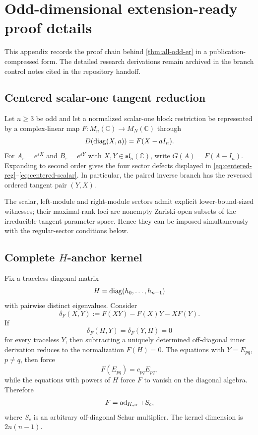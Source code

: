 \section{Odd-dimensional extension-ready proof details}\label{app:odd-proof}

This appendix records the proof chain behind \cref{thm:all-odd-er} in a publication-compressed form. The detailed research derivations remain archived in the branch control notes cited in the repository handoff.

\subsection{Centered scalar-one tangent reduction}
Let $n\ge3$ be odd and let a normalized scalar-one block restriction be represented by a complex-linear map $F:M_n(\mathbb C)\to M_N(\mathbb C)$ through
\[
D(\operatorname{diag}(X,a))=F(X-aI_n).
\]
For $A_\varepsilon=e^{\varepsilon X}$ and $B_\varepsilon=e^{\varepsilon Y}$ with $X,Y\in\mathfrak{sl}_n(\mathbb C)$, write $G(A)=F(A-I_n)$. Expanding to second order gives the four sector defects displayed in \eqref{eq:centered-reg}--\eqref{eq:centered-scalar}. In particular, the paired inverse branch has the reversed ordered tangent pair $(Y,X)$.

The scalar, left-module and right-module sectors admit explicit lower-bound-sized witnesses; their maximal-rank loci are nonempty Zariski-open subsets of the irreducible tangent parameter space. Hence they can be imposed simultaneously with the regular-sector conditions below.

\subsection{Complete $H$-anchor kernel}
Fix a traceless diagonal matrix
\[
H=\operatorname{diag}(h_0,\dots,h_{n-1})
\]
with pairwise distinct eigenvalues. Consider
\[
\delta_F(X,Y):=F(XY)-F(X)Y-XF(Y).
\]
If
\[
\delta_F(H,Y)=\delta_F(Y,H)=0
\]
for every traceless $Y$, then subtracting a uniquely determined off-diagonal inner derivation reduces to the normalization $F(H)=0$. The equations with $Y=E_{pq}$, $p\ne q$, then force
\[
F(E_{pq})=c_{pq}E_{pq},
\]
while the equations with powers of $H$ force $F$ to vanish on the diagonal algebra. Therefore
\begin{equation}\label{eq:H-kernel}
F=\operatorname{ad}_{K_{\mathrm{off}}}+S_c,
\end{equation}
where $S_c$ is an arbitrary off-diagonal Schur multiplier. The kernel dimension is $2n(n-1)$.

